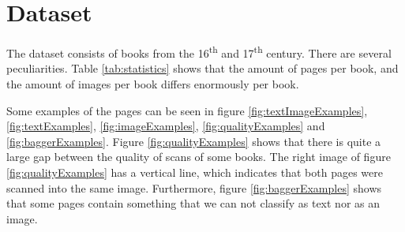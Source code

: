 \section{Dataset}
\label{sec:dataset}
The dataset consists of books from the 16\textsuperscript{th} and
17\textsuperscript{th} century. There are several peculiarities. Table
\ref{tab:statistics} shows that the amount of pages per book, and the amount of
images per book differs enormously per book.

Some examples of the pages can be seen in figure \ref{fig:textImageExamples},
\ref{fig:textExamples}, \ref{fig:imageExamples}, \ref{fig:qualityExamples} and
\ref{fig:baggerExamples}. Figure \ref{fig:qualityExamples} shows that there is
quite a large gap between the quality of scans of some books. The right image of
figure \ref{fig:qualityExamples}
has a vertical line, which indicates that both pages were scanned into the same
image. Furthermore, figure \ref{fig:baggerExamples} shows that some pages
contain something that we can not classify as text nor as an image.


